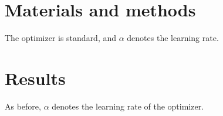 \section{Materials and methods}
The optimizer is standard, and $\alpha$ denotes the learning rate.
\section{Results}
As before, $\alpha$ denotes the learning rate of the optimizer.

